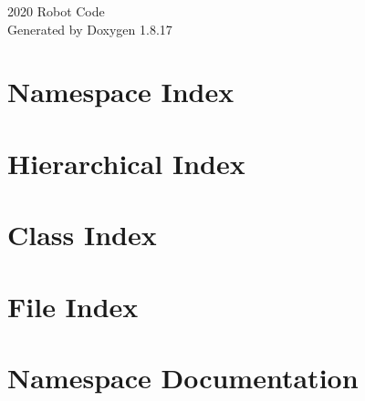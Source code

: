 \let\mypdfximage\pdfximage\def\pdfximage{\immediate\mypdfximage}\documentclass[twoside]{book}
\newcommand{\+}{\discretionary{\mbox{\scriptsize$\hookleftarrow$}}{}{}}
\newcommand{\clearemptydoublepage}{%
  \newpage{\pagestyle{empty}\cleardoublepage}%
}
\begin{document}
\hypersetup{pageanchor=false,
             bookmarksnumbered=true,
             pdfencoding=unicode
            }
\begin{titlepage}
\vspace*{7cm}
\begin{center}%
{\Large 2020 Robot Code }\\
\vspace*{1cm}
{\large Generated by Doxygen 1.8.17}\\
\end{center}
\end{titlepage}
\clearemptydoublepage
{}
\tableofcontents
\clearemptydoublepage
{}
\hypersetup{pageanchor=true}

\chapter{Namespace Index}

\chapter{Hierarchical Index}

\chapter{Class Index}

\chapter{File Index}

\chapter{Namespace Documentation}
















\end{document}
